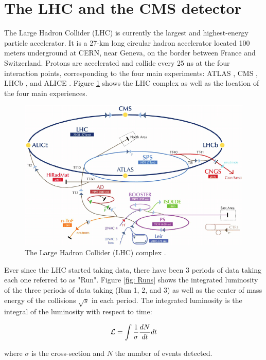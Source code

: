 \section{The LHC and the CMS detector} \label{section: CMS}


The Large Hadron Collider (LHC) is currently the largest and highest-energy particle accelerator. It is a 27-km long circular hadron accelerator located 100 meters underground at CERN, near Geneva, on the border between France and Switzerland. Protons are accelerated and collide every 25 ns at the four interaction points, corresponding to the four main experiments: ATLAS \cite{ATLAS}, CMS \cite{CMS}, LHCb \cite{LHCb}, and ALICE \cite{ALICE}. Figure \ref{fig: LHC} shows the  LHC complex as well as the location of the four main experiences.

\begin{figure}[hbt]
    \centering
    \includegraphics[width=0.6\linewidth]{Images/3.CMS/Existing-CERN-accelerator-complex-with-Large-Hadron-Collider-LHC-Super-Proton.png}
    \caption{The Large Hadron Collider (LHC) complex \cite{LHCFIG}.}
    \label{fig: LHC}
\end{figure}

Ever since the LHC started taking data, there have been 3 periods of data taking each one referred to as "Run". Figure \ref{fig: Runs} shows the integrated luminosity of the three periods of data taking (Run 1, 2, and 3) as well as the center of mass energy of the collisions $\sqrt{s}$ in each period. The integrated luminosity \lumi is the integral of the luminosity with respect to time:

\begin{equation}
    {\ensuremath{\mathcal{L}}}= \int \frac{1}{\sigma} \frac{dN}{dt} dt
\end{equation}

\noindent where $\sigma$ is the cross-section and $N$ the number of events detected.


